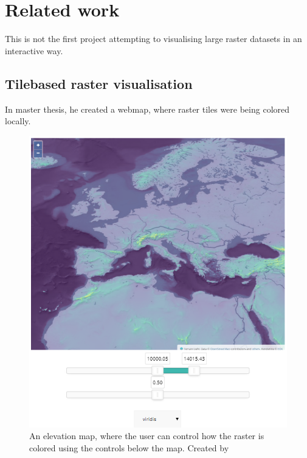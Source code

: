 \chapter{Related work}
This is not the first project attempting to visualising large raster datasets in an interactive way. 

\section{Tilebased raster visualisation}
In \citet{Baumrocks} master thesis, he created a webmap, where raster tiles were being colored locally. 

\begin{figure} [H]
	\centering
	\includegraphics[width=.8\textwidth]{Pictures/BaumrockMap1}
	\caption{An elevation map, where the user can control how the raster is colored using the controls below the map. Created by \citep{EOX}}
	\label{BaumrockMap1}
\end{figure}

